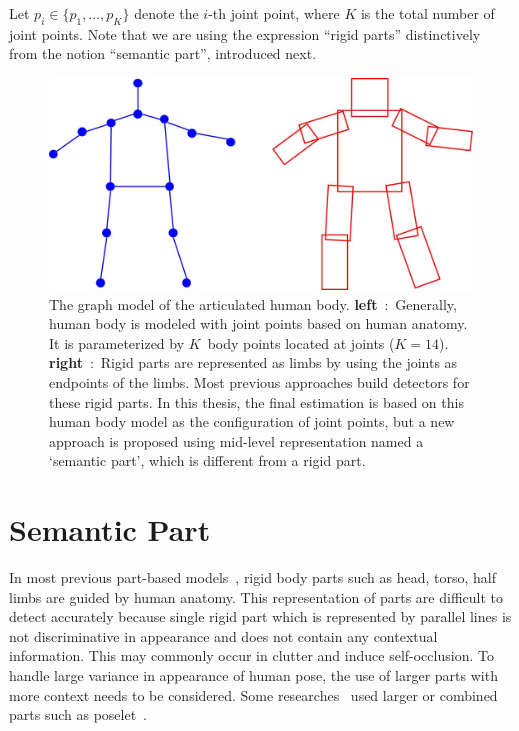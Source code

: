 \documentclass[master,english,final]{postech-ucs}
\begin{document}
Let $p_i \in \{p_1, \dots, p_K\}$ denote the $i$-th joint point, where $K$ is the total number of joint points. Note that we are using the expression ``rigid parts'' distinctively from the notion ``semantic part'', introduced next.


\newpage

\begin{figure}
\begin{center}
   \includegraphics[width=0.8\linewidth]{./fig/graphStructure.jpg}
\end{center}
   \caption{The graph model of the articulated human body. \textbf{left}~:~Generally, human body is modeled with joint points based on human anatomy. It is parameterized by $K$~body points located at joints ($K = 14$). \textbf{right}~:~Rigid parts are represented as limbs by using the joints as endpoints of the limbs. Most previous approaches build detectors for these rigid parts. In this thesis, the final estimation is based on this human body model as the configuration of joint points, but a new approach is proposed using mid-level representation named a `semantic part', which is different from a rigid part.}
\label{fig:graphStructure}
\end{figure}

\clearpage




\section{Semantic Part}
\label{sec:semanticPart}

In most previous part-based models~\cite{FMP:2011}, rigid body parts such as head, torso, half limbs are guided by human anatomy. This representation of parts are difficult to detect accurately because single rigid part which is represented by parallel lines is not discriminative in appearance and does not contain any contextual information. This may commonly occur in clutter and induce self-occlusion. To handle large variance in appearance of human pose, the use of larger parts with more context needs to be considered. Some researches~\cite{poselet_humanParsing:2011, APM:2011, poselet_pose:2013} used larger or combined parts such as poselet~\cite{poselet_original:2009}.
\end{document}
